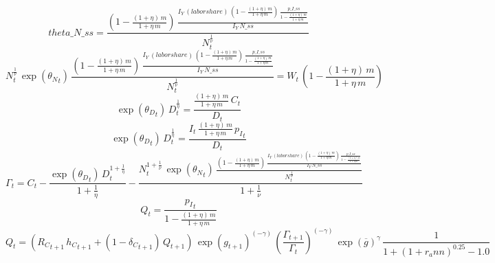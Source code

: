 \begin{dmath*}
theta\_N\_ss = \frac{\left(1-\frac{\left(1+{{\eta}}\right)\, {{m}}}{1+{{\eta}}\, {{m}}}\right)\, \frac{{{I_Y}}\, {(labor share)}\, \left(1-\frac{\left(1+{{\eta}}\right)\, {{m}}}{1+{{\eta}}\, {{m}}}\right)\, \frac{{p\_I\_ss}}{1-\frac{\left(1+{{\eta}}\right)\, {{m}}}{1+{{\eta}}\, {{m}}}}}{{{I_Y}}\, {N\_ss}}}{{{N}}_{t}^{\frac{1}{{\nu}}}}
\end{dmath*}
\begin{dmath}
{{N}}_{t}^{\frac{1}{{\nu}}}\, \exp\left({{\theta_N}}_{t}\right)\, \frac{\left(1-\frac{\left(1+{{\eta}}\right)\, {{m}}}{1+{{\eta}}\, {{m}}}\right)\, \frac{{{I_Y}}\, {(labor share)}\, \left(1-\frac{\left(1+{{\eta}}\right)\, {{m}}}{1+{{\eta}}\, {{m}}}\right)\, \frac{{p\_I\_ss}}{1-\frac{\left(1+{{\eta}}\right)\, {{m}}}{1+{{\eta}}\, {{m}}}}}{{{I_Y}}\, {N\_ss}}}{{{N}}_{t}^{\frac{1}{{\nu}}}}={{W}}_{t}\, \left(1-\frac{\left(1+{{\eta}}\right)\, {{m}}}{1+{{\eta}}\, {{m}}}\right)
\end{dmath}
\begin{dmath}
\exp\left({{\theta_D}}_{t}\right)\, {{D}}_{t}^{\frac{1}{{{\eta}}}}=\frac{\frac{\left(1+{{\eta}}\right)\, {{m}}}{1+{{\eta}}\, {{m}}}\, {{C}}_{t}}{{{D}}_{t}}
\end{dmath}
\begin{dmath}
\exp\left({{\theta_D}}_{t}\right)\, {{D}}_{t}^{\frac{1}{{{\eta}}}}=\frac{{{I}}_{t}\, \frac{\left(1+{{\eta}}\right)\, {{m}}}{1+{{\eta}}\, {{m}}}\, {{p_I}}_{t}}{{{D}}_{t}}
\end{dmath}
\begin{dmath}
{{\Gamma}}_{t}={{C}}_{t}-\frac{\exp\left({{\theta_D}}_{t}\right)\, {{D}}_{t}^{1+\frac{1}{{{\eta}}}}}{1+\frac{1}{{{\eta}}}}-\frac{{{N}}_{t}^{1+\frac{1}{{\nu}}}\, \exp\left({{\theta_N}}_{t}\right)\, \frac{\left(1-\frac{\left(1+{{\eta}}\right)\, {{m}}}{1+{{\eta}}\, {{m}}}\right)\, \frac{{{I_Y}}\, {(labor share)}\, \left(1-\frac{\left(1+{{\eta}}\right)\, {{m}}}{1+{{\eta}}\, {{m}}}\right)\, \frac{{p\_I\_ss}}{1-\frac{\left(1+{{\eta}}\right)\, {{m}}}{1+{{\eta}}\, {{m}}}}}{{{I_Y}}\, {N\_ss}}}{{{N}}_{t}^{\frac{1}{{\nu}}}}}{1+\frac{1}{{\nu}}}
\end{dmath}
\begin{dmath}
{{Q}}_{t}=\frac{{{p_I}}_{t}}{1-\frac{\left(1+{{\eta}}\right)\, {{m}}}{1+{{\eta}}\, {{m}}}}
\end{dmath}
\begin{dmath}
{{Q}}_{t}=\left({{R_C}}_{t+1}\, {{h_C}}_{t+1}+\left(1-{{\delta_C}}_{t+1}\right)\, {{Q}}_{t+1}\right)\, \exp\left({{g}}_{t+1}\right)^{\left(-{{\gamma}}\right)}\, \left(\frac{{{\Gamma}}_{t+1}}{{{\Gamma}}_{t}}\right)^{\left(-{{\gamma}}\right)}\, \exp\left({{\overline{g}}}\right)^{{{\gamma}}}\, \frac{1}{1+\left(1+{{r_ann}}\right)^{0.25}-1.0}
\end{dmath}
